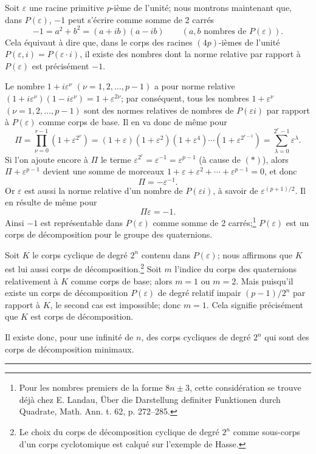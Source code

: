 Soit $\varepsilon$ une racine primitive $p$-ième de l'unité; nous montrons maintenant que, dans $P(\varepsilon)$, $-1$ peut s'écrire comme somme de 2 carrés
\[
        -1=a^2+b^2=(a+ib)(a-ib)\qquad (a,b\text{ nombres de }P(\varepsilon)).
\]
Cela équivaut à dire que, dans le corps des racines $(4p)$-ièmes de l'unité $P(\varepsilon,i)=P(\varepsilon\cdot i)$, il existe des nombres dont la norme relative par rapport à $P(\varepsilon)$ est précisément $-1$.

Le nombre $1+i\varepsilon^\nu$ $(\nu=1,2,\ldots,p-1)$ a pour norme relative $(1+i\varepsilon^\nu)(1-i\varepsilon^\nu)=1+\varepsilon^{2\nu}$; par conséquent, tous les nombres $1+\varepsilon^\nu$ $(\nu=1,2,\ldots,p-1)$ sont des normes relatives de nombres de $P(\varepsilon i)$ par rapport à $P(\varepsilon)$ comme corps de base. Il en va donc de même pour
\[
\Pi=\prod_{\nu=0}^{r-1}(1+\varepsilon^{2^\nu})
=(1+\varepsilon)(1+\varepsilon^2)(1+\varepsilon^4)\cdots(1+\varepsilon^{2^{r-1}})
=\sum_{\lambda=0}^{2^r-1}\varepsilon^\lambda.
\]
Si l'on ajoute encore à $\Pi$ le terme $\varepsilon^{2^r}=\varepsilon^{-1}=\varepsilon^{p-1}$ (à cause de $(*)$), alors $\Pi+\varepsilon^{p-1}$ devient une somme de morceaux $1+\varepsilon+\varepsilon^2+\cdots+\varepsilon^{p-1}=0$, et donc
\[
        \Pi=-\varepsilon^{-1}.
\]
Or $\varepsilon$ est aussi la norme relative d'un nombre de $P(\varepsilon i)$, à savoir de $\varepsilon^{(p+1)/2}$. Il en résulte de même pour
\[
        \Pi\varepsilon=-1.
\]
Ainsi $-1$ est représentable dans $P(\varepsilon)$ comme somme de 2 carrés;\footnote{Pour les nombres premiers de la forme $8n\pm3$, cette considération se trouve déjà chez E. Landau, Über die Darstellung definiter Funktionen durch Quadrate, Math. Ann. t. 62, p. 272--285.} $P(\varepsilon)$ est un corps de décomposition pour le groupe des quaternions.

Soit $K$ le corps cyclique de degré $2^n$ contenu dans $P(\varepsilon)$; nous affirmons que $K$ est lui aussi corps de décomposition.\footnote{Le choix du corps de décomposition cyclique de degré $2^n$ comme sous-corps d'un corps cyclotomique est calqué sur l'exemple de Hasse.} Soit $m$ l'indice du corps des quaternions relativement à $K$ comme corps de base; alors $m=1$ ou $m=2$. Mais puisqu'il existe un corps de décomposition $P(\varepsilon)$ de degré relatif impair $(p-1)/2^n$ par rapport à $K$, le second cas est impossible; donc $m=1$. Cela signifie précisément que $K$ est corps de décomposition.

Il existe donc, pour une infinité de $n$, des corps cycliques de degré $2^n$ qui sont des corps de décomposition minimaux.

\begin{center}
\rule{7em}{0.4pt}
\end{center}
